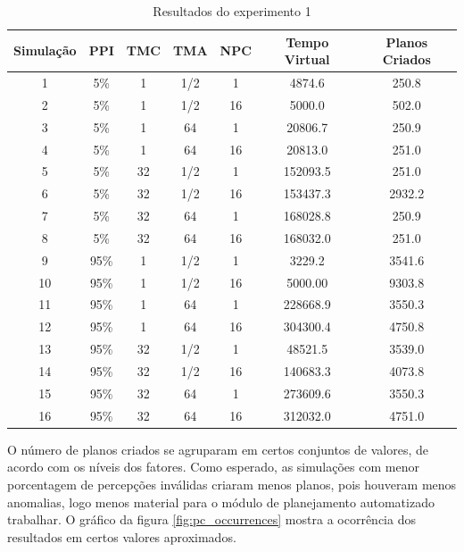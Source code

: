 \begin{table}[h!]
    \begin{center}
        \caption{ Resultados do experimento 1}
        \label{table:experimento1}
        \begin{tabular}{ |c|c|c|c|c|c|c| }
            \hline
            \textbf{Simulação} & \textbf{PPI} & \textbf{TMC} & \textbf{TMA} & \textbf{NPC} & \textbf{Tempo Virtual} & \textbf{Planos Criados}\\
            \hline
            1 & 5\% & 1 & 1/2 & 1 & 4874.6 & 250.8\\
            \hline
            2 & 5\% & 1 & 1/2 & 16 & 5000.0 & 502.0\\
            \hline
            3 & 5\% & 1 & 64 & 1 & 20806.7 & 250.9\\
            \hline
            4 & 5\% & 1 & 64 & 16 & 20813.0 & 251.0\\
            \hline
            5 & 5\% & 32 & 1/2 & 1 & 152093.5 & 251.0\\
            \hline
            6 & 5\% & 32 & 1/2 & 16 & 153437.3 & 2932.2\\
            \hline
            7 & 5\% & 32 & 64 & 1 & 168028.8 & 250.9\\
            \hline
            8 & 5\% & 32 & 64 & 16 & 168032.0 & 251.0\\
            \hline
            9 & 95\% & 1 & 1/2 & 1 & 3229.2 & 3541.6\\
            \hline
            10 & 95\% & 1 & 1/2 & 16 & 5000.00 & 9303.8\\
            \hline
            11 & 95\% & 1 & 64 & 1 & 228668.9 & 3550.3\\
            \hline
            12 & 95\% & 1 & 64 & 16 & 304300.4 & 4750.8\\
            \hline
            13 & 95\% & 32 & 1/2 & 1 & 48521.5 & 3539.0\\
            \hline
            14 & 95\% & 32 & 1/2 & 16 & 140683.3 & 4073.8\\
            \hline
            15 & 95\% & 32 & 64 & 1 & 273609.6 & 3550.3\\
            \hline
            16 & 95\% & 32 & 64 & 16 & 312032.0 & 4751.0\\
            \hline
        \end{tabular}{}
    \end{center}{}
\end{table}

O número de planos criados se agruparam em certos conjuntos de valores, de acordo com os níveis dos fatores. Como esperado, as simulações com menor porcentagem de percepções inválidas criaram menos planos, pois houveram menos anomalias, logo menos material para o módulo de planejamento automatizado trabalhar. O gráfico da figura \ref{fig:pc_occurrences} mostra a ocorrência dos resultados em certos valores aproximados.

